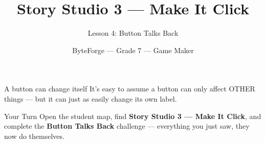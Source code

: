 \documentclass[aspectratio=169]{beamer}
\title{Story Studio 3 — Make It Click}
\subtitle{Lesson 4: Button Talks Back}
\author{ByteForge --- Grade 7 --- Game Maker}
\date{}
\begin{document}
\begin{frame}
    \titlepage
\end{frame}

\begin{frame}{A button can change itself}
    \Large
    It's easy to assume a button can only affect OTHER things — but it can just as easily change its own label.
\end{frame}

\begin{frame}{Your Turn}
    \Large
    Open the student map, find \textbf{Story Studio 3 — Make It Click}, and complete
    the \textbf{Button Talks Back} challenge --- everything you just saw, they now do themselves.
\end{frame}
\end{document}
